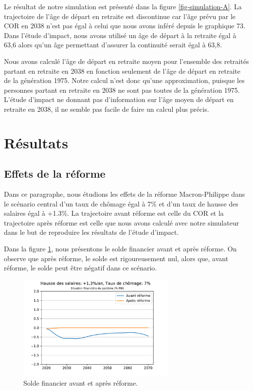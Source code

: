 \documentclass[10pt]{article}
\begin{document}
Le résultat de notre simulation est présenté dans la figure \ref{fig-simulation-A}. 
La trajectoire de l'âge de départ en retraite est discontinue car l'âge prévu par le COR en 2038 n'est pas égal à celui que nous avons inféré depuis le graphique 73. Dans l'étude d'impact, nous avons utilisé un âge de départ à la retraite égal à 63,6 alors qu'un âge permettant d'assurer la continuité serait égal à 63,8.

Nous avons calculé l'âge de départ en retraite moyen pour l'ensemble des retraités partant en retraite en 2038 en fonction seulement de l'âge de départ en retraite de la génération 1975. Notre calcul n'est donc qu'une approximation, puisque les personnes partant en retraite en 2038 ne sont pas toutes de la génération 1975. L'étude d'impact ne donnant pas d'information sur l'âge moyen de départ en retraite en 2038, il ne semble pas facile de faire un calcul plus précis. 


\section{Résultats}

\subsection{Effets de la réforme}

Dans ce paragraphe, nous étudions les effets de la réforme Macron-Philippe dans 
le scénario central d'un taux de chômage égal à 7\% 
et d'un taux de hausse des salaires égal à +1.3\%. 
La trajectoire avant réforme est celle du COR et la trajectoire après réforme est celle 
que nous avons calculé avec notre simulateur dans le but de reproduire les 
résultats de l'étude d'impact. 

Dans la figure \ref{fig-solde-avant-apres-reforme}, nous présentons le 
solde financier avant et après réforme. 
On observe que après réforme, le solde est rigoureusement nul, 
alors que, avant réforme, le solde peut être négatif dans ce scénario. 

\begin{figure}
\begin{center}
\includegraphics[width=0.7\textwidth]{Simulation-vs-avant-reforme-Solde.pdf}
\end{center}
\caption{Solde financier avant et après réforme.}
\label{fig-solde-avant-apres-reforme}
\end{figure}
\end{document}
